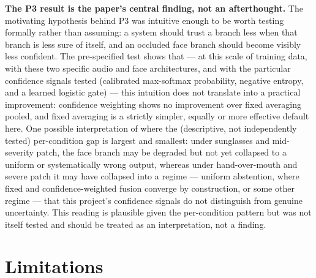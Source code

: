 \documentclass[10pt]{article}
\begin{document}
\textbf{The P3 result is the paper's central finding, not an afterthought.} The motivating hypothesis behind
P3 was intuitive enough to be worth testing formally rather than assuming: a system should trust a branch
less when that branch is less sure of itself, and an occluded face branch should become visibly less
confident. The pre-specified test shows that --- at this scale of training data, with these two specific
audio and face architectures, and with the particular confidence signals tested (calibrated max-softmax
probability, negative entropy, and a learned logistic gate) --- this intuition does not translate into a
practical improvement: confidence weighting shows no improvement over fixed averaging pooled, and fixed
averaging is a strictly simpler, equally or more effective default here. One possible interpretation of
where the (descriptive, not independently tested) per-condition gap is largest and smallest: under
sunglasses and mid-severity patch, the face branch may be degraded but not yet collapsed to a uniform or
systematically wrong output, whereas under hand-over-mouth and severe patch it may have collapsed into a
regime --- uniform abstention, where fixed and confidence-weighted fusion converge by construction, or some
other regime --- that this project's confidence signals do not distinguish from genuine uncertainty. This
reading is plausible given the per-condition pattern but was not itself tested and should be treated as
an interpretation, not a finding.

\section{Limitations}
\label{sec:limitations}
\end{document}
